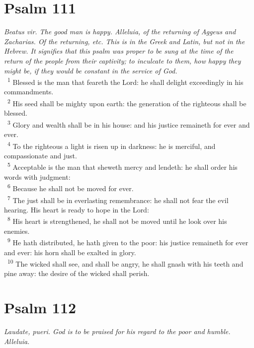 \documentclass[a5paper,12pt]{article}
\begin{document}
\begin{multicols*}{2}
\section{Psalm 111}
\label{sec:org8515266}
\emph{Beatus vir. The good man is happy. Alleluia, of the returning of Aggeus and Zacharias. Of the returning, etc. This is in the Greek and Latin, but not in the Hebrew. It signifies that this psalm was proper to be sung at the time of the return of the people from their captivity; to inculcate to them, how happy they might be, if they would be constant in the service of God.}\\

~\textsuperscript{1} Blessed is the man that feareth the Lord: he shall delight exceedingly in his commandments.\\
~\textsuperscript{2} His seed shall be mighty upon earth: the generation of the righteous shall be blessed.\\
~\textsuperscript{3} Glory and wealth shall be in his house: and his justice remaineth for ever and ever.\\
~\textsuperscript{4} To the righteous a light is risen up in darkness: he is merciful, and compassionate and just.\\
~\textsuperscript{5} Acceptable is the man that sheweth mercy and lendeth: he shall order his words with judgment:\\
~\textsuperscript{6} Because he shall not be moved for ever.\\
~\textsuperscript{7} The just shall be in everlasting remembrance: he shall not fear the evil hearing. His heart is ready to hope in the Lord:\\
~\textsuperscript{8} His heart is strengthened, he shall not be moved until he look over his enemies.\\
~\textsuperscript{9} He hath distributed, he hath given to the poor: his justice remaineth for ever and ever: his horn shall be exalted in glory.\\
~\textsuperscript{10} The wicked shall see, and shall be angry, he shall gnash with his teeth and pine away: the desire of the wicked shall perish.\\

\section{Psalm 112}
\label{sec:orge5268f0}
\emph{Laudate, pueri. God is to be praised for his regard to the poor and humble. Alleluia.}\\


\end{multicols*}
\end{document}

